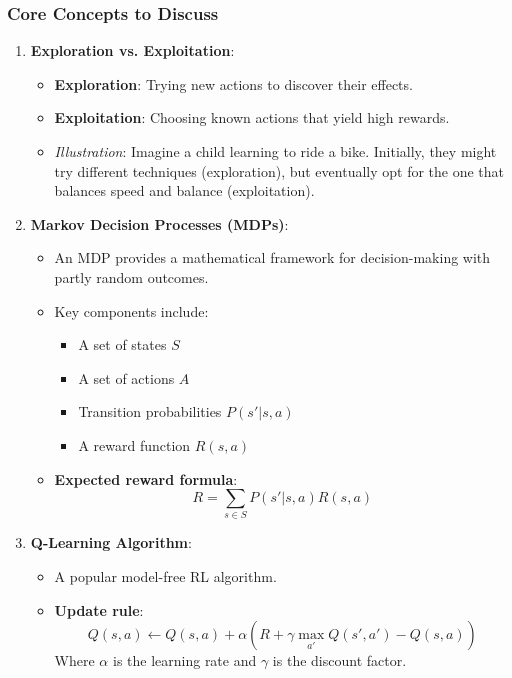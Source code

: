 \documentclass[aspectratio=169]{beamer}
\begin{document}
\begin{frame}[fragile]
    \frametitle{Core Concepts to Discuss}
    \begin{enumerate}
        \item \textbf{Exploration vs. Exploitation}:
        \begin{itemize}
            \item \textbf{Exploration}: Trying new actions to discover their effects.
            \item \textbf{Exploitation}: Choosing known actions that yield high rewards.
            \item \textit{Illustration}: Imagine a child learning to ride a bike. Initially, they might try different techniques (exploration), but eventually opt for the one that balances speed and balance (exploitation).
        \end{itemize}

        \item \textbf{Markov Decision Processes (MDPs)}:
        \begin{itemize}
            \item An MDP provides a mathematical framework for decision-making with partly random outcomes.
            \item Key components include:
            \begin{itemize}
                \item A set of states \( S \)
                \item A set of actions \( A \)
                \item Transition probabilities \( P(s'|s, a) \)
                \item A reward function \( R(s, a) \)
            \end{itemize}
            \item \textbf{Expected reward formula}:
            \begin{equation}
                R = \sum_{s \in S} P(s'|s, a) R(s, a)
            \end{equation}
        \end{itemize}

        \item \textbf{Q-Learning Algorithm}:
        \begin{itemize}
            \item A popular model-free RL algorithm.
            \item \textbf{Update rule}:
            \begin{equation}
                Q(s, a) \leftarrow Q(s, a) + \alpha (R + \gamma \max_{a'} Q(s', a') - Q(s, a))
            \end{equation}
            Where \( \alpha \) is the learning rate and \( \gamma \) is the discount factor.
        \end{itemize}
    \end{enumerate}
\end{frame}
\end{document}
